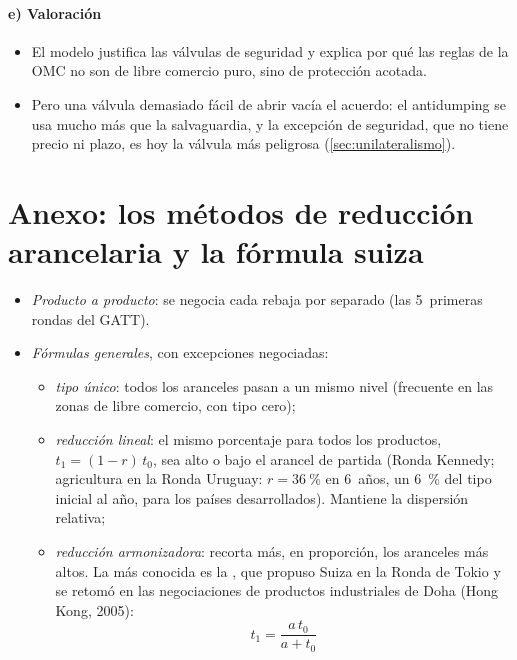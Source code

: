 \documentclass[11pt]{article}
\begin{document}
\paragraph{e) Valoración}

\begin{itemize}
\item El modelo justifica las válvulas de seguridad y explica por qué las reglas de la OMC no son de libre comercio puro, sino de protección acotada.
\item Pero una válvula demasiado fácil de abrir vacía el acuerdo: el antidumping se usa mucho más que la salvaguardia, y la excepción de seguridad, que no tiene precio ni plazo, es hoy la válvula más peligrosa (\ref{sec:unilateralismo}).
\end{itemize}

\section{Anexo: los métodos de reducción arancelaria\cortetitulo{} y la fórmula suiza}\label{anexo:formulas}

\begin{itemize}
\item \emph{Producto a producto}: se negocia cada rebaja por separado (las 5~primeras rondas del GATT).
\item \emph{Fórmulas generales}, con excepciones negociadas:
  \begin{itemize}
  \item \emph{tipo único}: todos los aranceles pasan a un mismo nivel (frecuente en las zonas de libre comercio, con tipo cero);
  \item \emph{reducción lineal}: el mismo porcentaje para todos los productos, $t_1=(1-r)\,t_0$, sea alto o bajo el arancel de partida (Ronda Kennedy; agricultura en la Ronda Uruguay: $r=36~\%$ en 6~años, un 6~\% del tipo inicial al año, para los países desarrollados). Mantiene la dispersión relativa;
  \item \emph{reducción armonizadora}: recorta más, en proporción, los aranceles más altos. La más conocida es la , que propuso Suiza en la Ronda de Tokio y se retomó en las negociaciones de productos industriales de Doha (Hong Kong, 2005):
    \begin{equation}\label{eq:suiza}
    t_1=\frac{a\,t_0}{a+t_0}
    \end{equation}
  \end{itemize}
\end{itemize}
\end{document}
